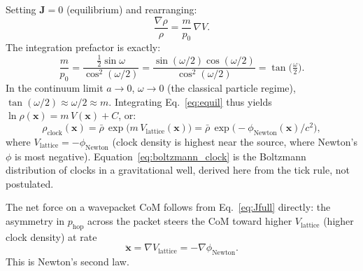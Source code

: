 Setting $\mathbf{J} = 0$ (equilibrium) and rearranging:
\begin{equation}
    \frac{\nabla\rho}{\rho} = \frac{m}{p_0}\,\nabla V.
    \label{eq:equil}
\end{equation}
The integration prefactor is exactly:
\begin{equation}
    \frac{m}{p_0} = \frac{\frac{1}{2}\sin\omega}{\cos^2(\omega/2)} 
                  = \frac{\sin(\omega/2)\cos(\omega/2)}{\cos^2(\omega/2)} 
                  = \tan\bigl(\tfrac{\omega}{2}\bigr).
\end{equation}
In the continuum limit $a\to 0$, $\omega\to 0$ (the classical particle regime),
$\tan(\omega/2) \approx \omega/2 \approx m$. Integrating Eq.~\eqref{eq:equil} thus yields
$\ln\rho(\mathbf{x}) = m\,V(\mathbf{x}) + C$, or:
\begin{equation}
    \rho_\mathrm{clock}(\mathbf{x})
        = \bar\rho\,\exp\!\bigl(m\,V_\mathrm{lattice}(\mathbf{x})\bigr)
        = \bar\rho\,\exp\!\bigl(-\phi_\mathrm{Newton}(\mathbf{x})/c^2\bigr),
    \label{eq:boltzmann_clock}
\end{equation}
where $V_\mathrm{lattice} = -\phi_\mathrm{Newton}$ (clock density is
highest near the source, where Newton's $\phi$ is most negative).
Equation~\eqref{eq:boltzmann_clock} is the Boltzmann distribution of
clocks in a gravitational well, derived here from the tick rule, not
postulated.

The net force on a wavepacket CoM follows from
Eq.~\eqref{eq:Jfull} directly:
the asymmetry in $p_\mathrm{hop}$ across the packet steers the CoM
toward higher $V_\mathrm{lattice}$ (higher clock density) at rate
\begin{equation}
    \ddot{\mathbf{x}} = \nabla V_\mathrm{lattice} = -\nabla\phi_\mathrm{Newton}.
    \label{eq:newton2}
\end{equation}
This is Newton's second law.

